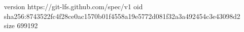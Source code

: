 version https://git-lfs.github.com/spec/v1
oid sha256:8743522fc4f28ce0ac1570b01f4558a19e5772d081f32a3a492454c3e43098d2
size 699192
